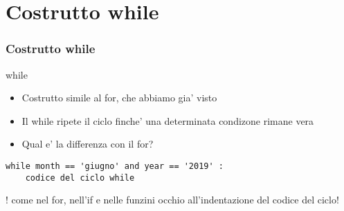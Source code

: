 \section{Costrutto while}

\begin{frame}[fragile]
\frametitle{Costrutto while}
\begin{block}{while}
    \begin{itemize}
        \item Costrutto simile al for, che abbiamo gia' visto
        \item Il while ripete il ciclo finche' una determinata condizone rimane vera 
        \item Qual e' la differenza con il for?
    \end{itemize}
\end{block}

    \begin{lstlisting}
while month == 'giugno' and year == '2019' :
    codice del ciclo while
    \end{lstlisting}
    
! come nel for, nell'if e nelle funzini occhio all'indentazione del codice del ciclo!

\end{frame}